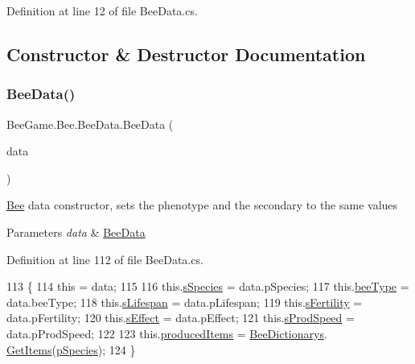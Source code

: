 Definition at line 12 of file Bee\+Data.\+cs.



\subsection{Constructor \& Destructor Documentation}
\mbox{\label{struct_bee_game_1_1_bee_1_1_bee_data_ae105a46ac786f4ba927efeaf4ef02f86}} 
\subsubsection{\texorpdfstring{Bee\+Data()}{BeeData()}}
{\footnotesize\ttfamily Bee\+Game.\+Bee.\+Bee\+Data.\+Bee\+Data (\begin{DoxyParamCaption}\item[{\hyperlink{struct_bee_game_1_1_bee_1_1_bee_data}{Bee\+Data}}]{data }\end{DoxyParamCaption})}



\hyperlink{namespace_bee_game_1_1_bee}{Bee} data constructor, sets the phenotype and the secondary to the same values 


\begin{DoxyParams}{Parameters}
{\em data} & \hyperlink{struct_bee_game_1_1_bee_1_1_bee_data}{Bee\+Data}\\
\hline
\end{DoxyParams}


Definition at line 112 of file Bee\+Data.\+cs.


\begin{DoxyCode}
113         \{
114             \textcolor{keyword}{this} = data;
115 
116             this.\hyperlink{struct_bee_game_1_1_bee_1_1_bee_data_add33b8a3084a342ad7176a9366c2fc55}{sSpecies} = data.pSpecies;
117             this.\hyperlink{struct_bee_game_1_1_bee_1_1_bee_data_acfb6e209ae7bd1b52928580fcce4c743}{beeType} = data.beeType;
118             this.\hyperlink{struct_bee_game_1_1_bee_1_1_bee_data_af5c384db9813e463bb0d66cb8b443d87}{sLifespan} = data.pLifespan;
119             this.\hyperlink{struct_bee_game_1_1_bee_1_1_bee_data_a20a4084334bbbba3942f67622596b596}{sFertility} = data.pFertility;
120             this.\hyperlink{struct_bee_game_1_1_bee_1_1_bee_data_ac65b550d77e529a62cb60acf86502bc2}{sEffect} = data.pEffect;
121             this.\hyperlink{struct_bee_game_1_1_bee_1_1_bee_data_af2e94ee206fd06b8314888f8ba3d56e9}{sProdSpeed} = data.pProdSpeed;
122 
123             this.\hyperlink{struct_bee_game_1_1_bee_1_1_bee_data_a3c49396295407e1744f501e86c32d61c}{producedItems} = \hyperlink{class_bee_game_1_1_core_1_1_bee_dictionarys}{BeeDictionarys}.
      \hyperlink{class_bee_game_1_1_core_1_1_bee_dictionarys_a2cd137701cfdcfeb25d5e7a73397e1b4}{GetItems}(\hyperlink{struct_bee_game_1_1_bee_1_1_bee_data_a87db9add2bcc463ab444eb4ac7a4e228}{pSpecies});
124         \}
\end{DoxyCode}


